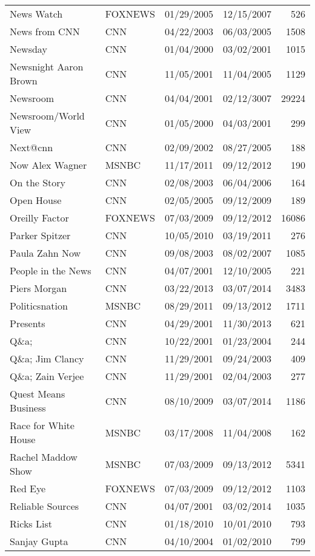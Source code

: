 {\begin{longtable}{llllr}
  News Watch & FOXNEWS & 01/29/2005 & 12/15/2007 & 526 \\ 
  News from CNN & CNN & 04/22/2003 & 06/03/2005 & 1508 \\ 
  Newsday & CNN & 01/04/2000 & 03/02/2001 & 1015 \\ 
  Newsnight Aaron Brown & CNN & 11/05/2001 & 11/04/2005 & 1129 \\ 
  Newsroom & CNN & 04/04/2001 & 02/12/3007 & 29224 \\ 
  Newsroom/World View & CNN & 01/05/2000 & 04/03/2001 & 299 \\ 
  Next@cnn & CNN & 02/09/2002 & 08/27/2005 & 188 \\ 
  Now Alex Wagner & MSNBC & 11/17/2011 & 09/12/2012 & 190 \\ 
  On the Story & CNN & 02/08/2003 & 06/04/2006 & 164 \\ 
  Open House & CNN & 02/05/2005 & 09/12/2009 & 189 \\ 
  Oreilly Factor & FOXNEWS & 07/03/2009 & 09/12/2012 & 16086 \\ 
  Parker Spitzer & CNN & 10/05/2010 & 03/19/2011 & 276 \\ 
  Paula Zahn Now & CNN & 09/08/2003 & 08/02/2007 & 1085 \\ 
  People in the News & CNN & 04/07/2001 & 12/10/2005 & 221 \\ 
  Piers Morgan & CNN & 03/22/2013 & 03/07/2014 & 3483 \\ 
  Politicsnation & MSNBC & 08/29/2011 & 09/13/2012 & 1711 \\ 
  Presents & CNN & 04/29/2001 & 11/30/2013 & 621 \\ 
  Q\&a; & CNN & 10/22/2001 & 01/23/2004 & 244 \\ 
  Q\&a; Jim Clancy & CNN & 11/29/2001 & 09/24/2003 & 409 \\ 
  Q\&a; Zain Verjee & CNN & 11/29/2001 & 02/04/2003 & 277 \\ 
  Quest Means Business & CNN & 08/10/2009 & 03/07/2014 & 1186 \\ 
  Race for White House & MSNBC & 03/17/2008 & 11/04/2008 & 162 \\ 
  Rachel Maddow Show & MSNBC & 07/03/2009 & 09/13/2012 & 5341 \\ 
  Red Eye & FOXNEWS & 07/03/2009 & 09/12/2012 & 1103 \\ 
  Reliable Sources & CNN & 04/07/2001 & 03/02/2014 & 1035 \\ 
  Ricks List & CNN & 01/18/2010 & 10/01/2010 & 793 \\ 
  Sanjay Gupta & CNN & 04/10/2004 & 01/02/2010 & 799 \\ 

\end{longtable}}
